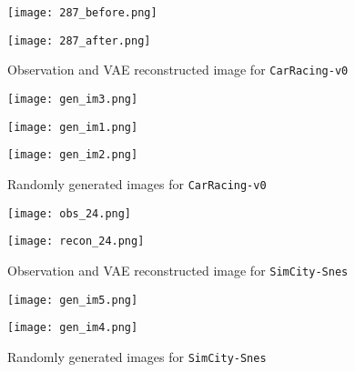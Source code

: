 \documentclass{article}
\numberwithin{figure}{section}
\theoremstyle{definition}
\begin{document}
\begin{figure}
  \centering
  \begin{minipage}{0.45\textwidth}
      \centering
      \texttt{[image: 287\_before.png]} %
  \end{minipage}\hfill
  \begin{minipage}{0.45\textwidth}
      \centering
      \texttt{[image: 287\_after.png]} %
  \end{minipage}
  \caption{Observation and VAE reconstructed image for \texttt{CarRacing-v0}}
\end{figure}

\begin{figure}
  \centering
  \begin{minipage}{0.3\textwidth}
      \centering
      \texttt{[image: gen\_im3.png]} %
  \end{minipage}\hfill
  \begin{minipage}{0.3\textwidth}
      \centering
      \texttt{[image: gen\_im1.png]} %
  \end{minipage}\hfill
  \begin{minipage}{0.3\textwidth}
    \centering
    \texttt{[image: gen\_im2.png]} %
\end{minipage}
\caption{Randomly generated images for \texttt{CarRacing-v0}}
\end{figure}

\begin{figure}
  \centering
  \begin{minipage}{0.45\textwidth}
      \centering
      \texttt{[image: obs\_24.png]} %
  \end{minipage}\hfill
  \begin{minipage}{0.45\textwidth}
      \centering
      \texttt{[image: recon\_24.png]} %
  \end{minipage}
  \caption{Observation and VAE reconstructed image for \texttt{SimCity-Snes}}
\end{figure}

\begin{figure}
  \centering
  \begin{minipage}{0.45\textwidth}
      \centering
      \texttt{[image: gen\_im5.png]} %
  \end{minipage}\hfill
  \begin{minipage}{0.45\textwidth}
      \centering
      \texttt{[image: gen\_im4.png]} %
  \end{minipage}
  \caption{Randomly generated images for \texttt{SimCity-Snes}}
\end{figure}
\end{document}
